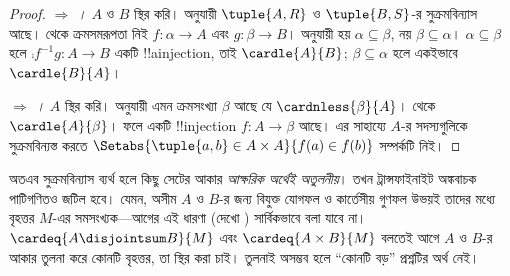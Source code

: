 \documentclass[../../../include/open-logic-section]{subfiles}
\begin{document}
\begin{proof}
\emph{ $\Rightarrow$
।} $A$ ও $B$ স্থির করি।
 অনুযায়ী $\tuple{A, R}$ ও
$\tuple{B, S}$-র সুক্রমবিন্যাস আছে।
থেকে ক্রমসমরূপতা নিই
$f \colon \alpha \to A$ এবং
$g \colon \beta \to B$।
অনুযায়ী হয় $\alpha \subseteq \beta$,
নয় $\beta \subseteq \alpha$।
$\alpha\subseteq\beta$ হলে
$\comp{f^{-1}}{g} \colon A \to B$
একটি !!a{injection}, তাই
$\cardle{A}{B}$; $\beta\subseteq\alpha$ হলে একইভাবে
$\cardle{B}{A}$।

\emph{ $\Rightarrow$
।} $A$ স্থির করি।
 অনুযায়ী এমন ক্রমসংখ্যা
$\beta$ আছে যে $\cardnless{\beta}{A}$।
 থেকে
$\cardle{A}{\beta}$। ফলে একটি !!{injection}
$f \colon A \to \beta$ আছে। এর সাহায্যে
$A$-র সদস্যগুলিকে সুক্রমবিন্যস্ত করতে
$\Setabs{\tuple{a, b} \in A \times A}{f(a)
\in f(b)}$ সম্পর্কটি নিই।
\end{proof}
\noindent
অতএব সুক্রমবিন্যাস ব্যর্থ হলে কিছু সেটের
আকার \emph{আক্ষরিক অর্থেই অতুলনীয়}। তখন
ট্রান্সফাইনাইট অঙ্কবাচক পাটিগণিতও জটিল হবে।
যেমন, অসীম $A$ ও $B$-র জন্য বিযুক্ত যোগফল
ও কার্তেসীয় গুণফল উভয়ই তাদের মধ্যে বৃহত্তর
$M$-এর সমসংখ্যক—আগের এই ধারণা
(দেখো )
সার্বিকভাবে বলা যাবে না।
$\cardeq{A \disjointsum B}{M}$ এবং
$\cardeq{A \times B}{M}$ বলতেই আগে
$A$ ও $B$-র আকার তুলনা করে কোনটি বৃহত্তর,
তা স্থির করা চাই। তুলনাই অসম্ভব হলে
``কোনটি বড়'' প্রশ্নটির অর্থ নেই।
\end{document}

